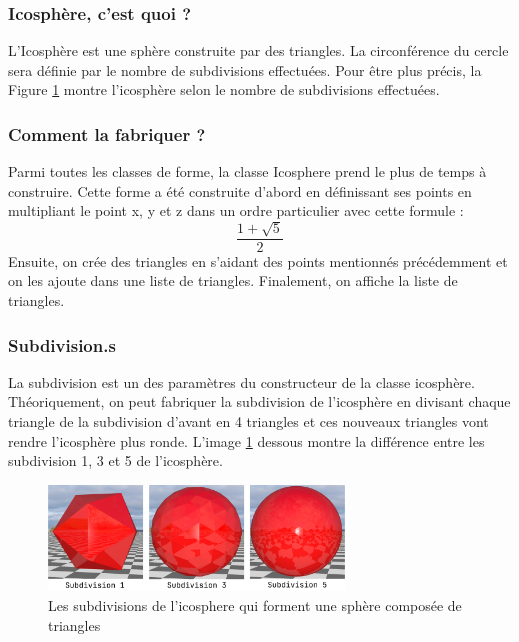 \documentclass[12pt]{article}
\begin{document}
\subsubsection{Icosphère, c'est quoi ?}
L'Icosphère est une sphère construite par des triangles. La circonférence du cercle sera définie par le nombre de subdivisions effectuées. Pour être plus précis, la Figure \ref{fig:image_subdiv} montre l'icosphère selon le nombre de subdivisions effectuées.

\subsubsection{Comment la fabriquer ?}
Parmi toutes les classes de forme, la classe Icosphere prend le plus de temps à construire. 
Cette forme a été construite d'abord en définissant ses points en multipliant le point x, y et z dans un ordre particulier avec cette formule :
$$\frac{1+\sqrt{5}}{2}$$
Ensuite, on crée des triangles en s'aidant des points mentionnés précédemment et on les ajoute dans une liste de triangles.
Finalement, on affiche la liste de triangles.

\subsubsection{Subdivision.s}
La subdivision est un des paramètres du constructeur de la classe icosphère.
Théoriquement, on peut fabriquer la subdivision de l'icosphère en divisant chaque triangle de la subdivision d'avant en 4 triangles et ces nouveaux triangles vont rendre l'icosphère plus ronde.
L'image \ref{fig:image_subdiv} dessous montre la différence entre les subdivision 1, 3 et 5 de l'icosphère.

\begin{figure}[ht]
  \begin{center}
    \includegraphics[width=0.7\textwidth]{./img/formes/subdivicosp.png} 
  \caption{Les subdivisions de l'icosphere qui forment une sphère composée de triangles}
  \label{fig:image_subdiv}
\end{center}
\end{figure}
\FloatBarrier
\end{document}
